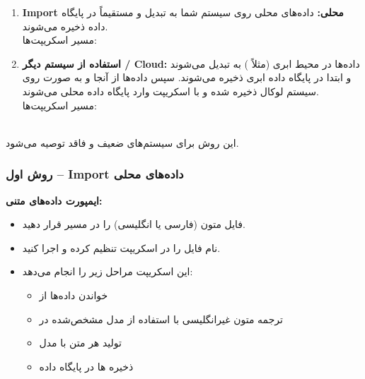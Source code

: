 \documentclass{article}
\begin{document}
\begin{enumerate}
\item \textbf{Import محلی:} داده‌های محلی روی سیستم شما به  تبدیل و مستقیماً در پایگاه داده  ذخیره می‌شوند.
\\
مسیر اسکریپت‌ها: \\

\item \textbf{استفاده از سیستم دیگر / Cloud:} داده‌ها در محیط ابری (مثلاً ) به  تبدیل می‌شوند و ابتدا در پایگاه داده ابری ذخیره می‌شوند.
سپس داده‌ها از آنجا  و به صورت  روی سیستم لوکال ذخیره شده و با اسکریپت وارد پایگاه داده محلی می‌شوند.
\\
مسیر اسکریپت‌ها: \\
 \\
\end{enumerate}

این روش برای سیستم‌های ضعیف و فاقد  توصیه می‌شود.

\subsubsection{روش اول – Import داده‌های محلی}

\textbf{ایمپورت داده‌های متنی:}
\begin{itemize}
\item فایل  متون (فارسی یا انگلیسی) را در مسیر  قرار دهید.

\item نام فایل را در اسکریپت  تنظیم کرده و اجرا کنید.

\item این اسکریپت مراحل زیر را انجام می‌دهد:
\begin{itemize}
\item خواندن داده‌ها از 
\item ترجمه متون غیرانگلیسی با استفاده از مدل  مشخص‌شده در 
\item تولید  هر متن با مدل 
\item ذخیره ها در پایگاه داده 
\end{itemize}
\end{itemize}
\end{document}

